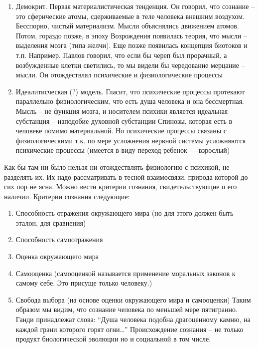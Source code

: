 \documentclass[12pt]{article}
\begin{document}
\begin{enumerate}
\item Демокрит.  Первая  материалистическая  тенденция.  Он  говорил,  что  сознание  –  это  сферические  атомы, 
сдерживаемые  в  теле  человека  внешним  воздухом.  Бесспорно,  чистый  материализм.  Мысли  объяснялись
движением атомов. Потом, гораздо позже, в эпоху Возрождения появилась теория, что мысли – выделения мозга
(типа желчи). Еще позже появилась концепция биотоков и т.п. Например, Павлов говорил, что если бы череп
был прорачный,  а возбужденные  клетки  светились,  то мы видели  бы чередование  мерцание  –  мысли.  Он
отождествлял психические и физиологические процессы 
\item Идеалитисческая (?) модель. Гласит, что психические процессы протекают параллельно физиологическим, что
есть душа человека и она бессмертная. Мысль – не функция мозга, и носителем психики является идеальная
субстанция – наподобие духовной субстанции Спинозы, которая есть в человеке помимо материальной. Но
психические процессы связаны с физиологическими т.к. по мере усложнения нервной системы усложняются
психические процессы (имеется в виду переход ребенок --- взрослый)
\end{enumerate}

Как бы там ни было нельзя ни отождествлять физиологию с психикой, не разделять их. Их надо рассматривать в
тесной взаимосвязи, природа которой до сих пор не ясна.
Можно вести критерии сознания, свидетельствующие о его наличии. Критерии сознания следующие:
\begin{enumerate}
\item Способность отражения окружающего мира (но для этого должен быть эталон, для сравнения)
\item Способность самоотражения
\item Оценка окружающего мира 
\item Самооценка (самооценкой называется применение моральных законов к самому себе. Это присуще только
человеку.)
\item Свобода выбора (на основе оценки окружающего мира и самооценки)
Таким образом мы видим, что сознание человека по меньшей мере пятигранно. Ганди принадлежат слова:
“Душа человека подобна драгоценному камню, на каждой грани которого горят огни…”
Происхождение сознания – не только продукт биологической эволюции но и социальной в том числе.
\end{enumerate}

\newpage
\end{document}
